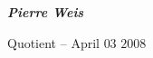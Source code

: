 \documentclass[landscape]{slides}
\begin{document}

\vspace*{2cm}

\begin{center}

{\large \bf \em Pierre Weis}

\vspace*{3cm}

Quotient -- April $03$ $2008$

\end{center}


\end{document}
